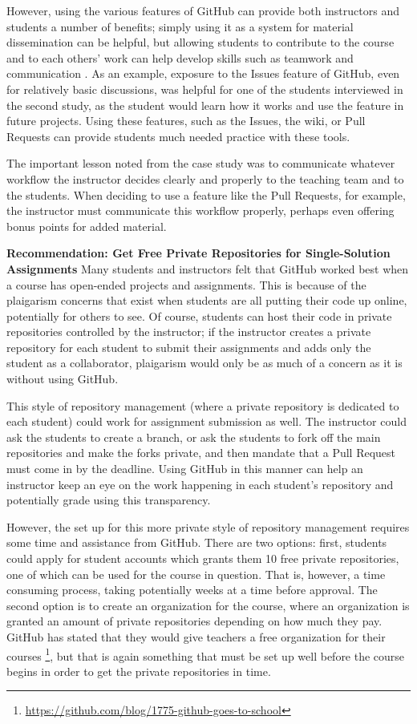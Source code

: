 However, using the various features of GitHub can provide both instructors and students a number of benefits; simply using it as a system for material dissemination can be helpful, but allowing students to contribute to the course and to each others' work can help develop skills such as teamwork and communication \cite{hamer2006some}. As an example, exposure to the Issues feature of GitHub, even for relatively basic discussions, was helpful for one of the students interviewed in the second study, as the student would learn how it works and use the feature in future projects. Using these features, such as the Issues, the wiki, or Pull Requests can provide students much needed practice with these tools.

The important lesson noted from the case study was to communicate whatever workflow the instructor decides clearly and properly to the teaching team and to the students. When deciding to use a feature like the Pull Requests, for example, the instructor must communicate this workflow properly, perhaps even offering bonus points for added material.


\textbf{Recommendation: Get Free Private Repositories for Single-Solution Assignments}
Many students and instructors felt that GitHub worked best when a course has open-ended projects and assignments. This is because of the plaigarism concerns that exist when students are all putting their code up online, potentially for others to see. Of course, students can host their code in private repositories controlled by the instructor; if the instructor creates a private repository for each student to submit their assignments and adds only the student as a collaborator, plaigarism would only be as much of a concern as it is without using GitHub.

This style of repository management (where a private repository is dedicated to each student) could work for assignment submission as well. The instructor could ask the students to create a branch, or ask the students to fork off the main repositories and make the forks private, and then mandate that a Pull Request must come in by the deadline. Using GitHub in this manner can help an instructor keep an eye on the work happening in each student's repository and potentially grade using this transparency.

However, the set up for this more private style of repository management requires some time and assistance from GitHub. There are two options: first, students could apply for student accounts which grants them 10 free private repositories, one of which can be used for the course in question. That is, however, a time consuming process, taking potentially weeks at a time before approval. The second option is to create an organization for the course, where an organization is granted an amount of private repositories depending on how much they pay. GitHub has stated that they would give teachers a free organization for their courses \footnote{\url{https://github.com/blog/1775-github-goes-to-school}}, but that is again something that must be set up well before the course begins in order to get the private repositories in time.

